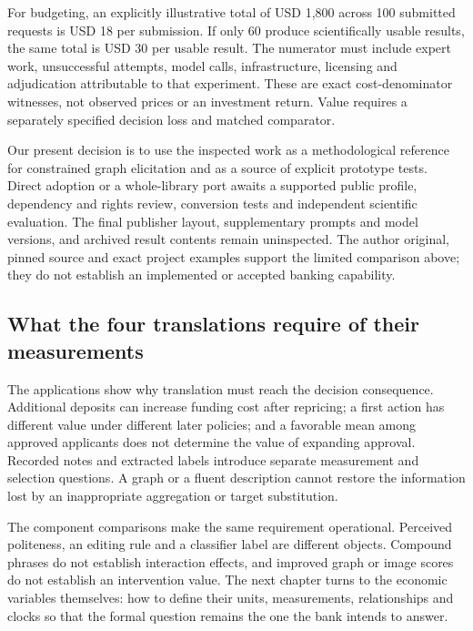 For budgeting, an explicitly illustrative total of USD 1,800 across 100
submitted requests is USD 18 per submission. If only 60 produce scientifically
usable results, the same total is USD 30 per usable result. The numerator
must include expert work, unsuccessful attempts, model calls, infrastructure,
licensing and adjudication attributable to that experiment. These are exact
cost-denominator witnesses, not observed prices or an investment return.
Value requires a separately specified decision loss and matched comparator.
\citep{exec24_ecmo_reference}

Our present decision is to use the inspected work as a methodological reference
for constrained graph elicitation and as a source of explicit prototype tests.
Direct adoption or a whole-library port awaits a supported public profile,
dependency and rights review, conversion tests and independent scientific
evaluation. The final publisher layout, supplementary prompts and model
versions, and archived result contents remain uninspected. The author
original, pinned source and exact project examples support the limited
comparison above; they do not establish an implemented or accepted banking
capability.~\citep{exec24_ecmo_original,exec24_ecmo_code,exec24_ecmo_reference}

\subsection{What the four translations require of their measurements}

The applications show why translation must reach the decision consequence.
Additional deposits can increase funding cost after repricing; a first action
has different value under different later policies; and a favorable mean
among approved applicants does not determine the value of expanding approval.
Recorded notes and extracted labels introduce separate measurement and
selection questions. A graph or a fluent description cannot restore the
information lost by an inappropriate aggregation or target substitution.

The component comparisons make the same requirement operational. Perceived
politeness, an editing rule and a classifier label are different objects.
Compound phrases do not establish interaction effects, and improved graph or
image scores do not establish an intervention value. The next chapter turns
to the economic variables themselves: how to define their units, measurements,
relationships and clocks so that the formal question remains the one the bank
intends to answer.

